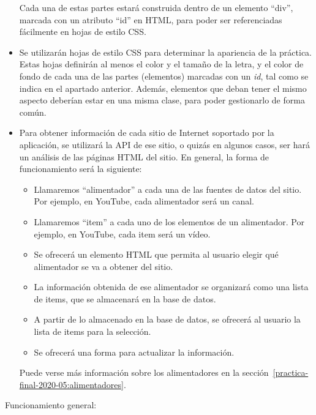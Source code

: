 \begin{itemize}
  Cada una de estas partes estará construida dentro de un elemento ``div'', marcada con un atributo ``id'' en HTML, para poder ser referenciadas fácilmente en hojas de estilo CSS.

\item Se utilizarán hojas de estilo CSS para determinar la apariencia de la práctica. Estas hojas definirán al menos el color y el tamaño de la letra, y el color de fondo de cada una de las partes (elementos) marcadas con un \emph{id}, tal como se indica en el apartado anterior. Además, elementos que deban tener el mismo aspecto deberían estar en una misma clase, para poder gestionarlo de forma común.
  
\item Para obtener información de cada sitio de Internet soportado por la aplicación, se utilizará la API de ese sitio, o quizás en algunos casos, ser hará un análisis de las páginas HTML del sitio. En general, la forma de funcionamiento será la siguiente:

  \begin{itemize}
  \item Llamaremos ``alimentador'' a cada una de las fuentes de datos del sitio. Por ejemplo, en YouTube, cada alimentador será un canal.
  \item Llamaremos ``item'' a cada uno de los elementos de un alimentador. Por ejemplo, en YouTube, cada item será un vídeo.
  \item Se ofrecerá un elemento HTML que permita al usuario elegir qué alimentador se va a obtener del sitio.
  \item La información obtenida de ese alimentador se organizará como una lista de items, que se almacenará en la base de datos.
  \item A partir de lo almacenado en la base de datos, se ofrecerá al usuario la lista de items para la selección.
  \item Se ofrecerá una forma para actualizar la información.
  \end{itemize}

  Puede verse más información sobre los alimentadores en la sección~\ref{practica-final-2020-05:alimentadores}.
\end{itemize}

Funcionamiento general:

